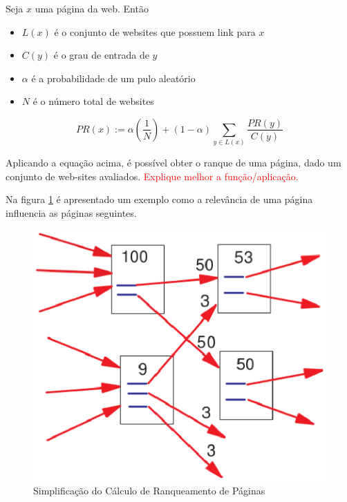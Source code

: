 Seja $x$ uma página da web. Então
\begin{itemize}
    \item $L(x)$ é o conjunto de websites que possuem link para $x$
    \item $C(y)$ é o grau de entrada de $y$
    \item $\alpha$ é a probabilidade de um pulo aleatório
    \item $N$ é o número total de websites
\end{itemize}
\[\displaystyle PR(x) := \alpha \left ( \frac{1}{N} \right ) + (1-\alpha) \sum_{y\in L(x)} \frac{PR(y)}{C(y)}\]

Aplicando a equação acima, é possível obter o ranque de uma página, dado um conjunto de web-sites avaliados. \textcolor{red}{Explique melhor a função/aplicação.}

 Na figura \ref{fig:page_rank} é apresentado um exemplo como a relevância de uma página influencia as páginas seguintes.

\begin{figure}[!h]
    \centering
        \includegraphics[keepaspectratio=true,scale=0.5]{figuras/page_rank.eps}
    \caption{Simplificação do Cálculo de Ranqueamento de Páginas}
    \label{fig:page_rank}
\end{figure}

